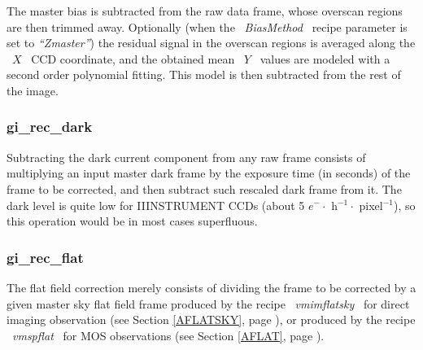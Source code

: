The master bias is subtracted from the raw data frame, whose
overscan regions are then trimmed away. Optionally (when 
the \ {\it BiasMethod} \ recipe parameter is set to {\it ``Zmaster''})
the residual signal in the overscan regions is averaged along
the \ $X$ \ CCD coordinate, and the obtained mean \ $Y$ \ values are
modeled with a second order polynomial fitting. This model is 
then subtracted from the rest of the image.

\subsubsection{gi\_rec\_dark}
\label{sec:ADARK}

Subtracting the dark current component from any raw frame consists 
of multiplying an input master dark frame by the exposure time 
(in seconds) of the frame to be corrected, and then subtract such
rescaled dark frame from it. The dark level is quite low for IIINSTRUMENT CCDs
(about 5 $e^{-} \cdot $ h$^{-1} \cdot $ pixel$^{-1}$), so this operation
would be in most cases superfluous.

\subsubsection{gi\_rec\_flat}
\label{sec:AFLATFIELDING}

The flat field correction merely consists of dividing the frame 
to be corrected by a given master sky flat field frame produced 
by the recipe \ {\it vmimflatsky} \ for direct imaging observation
(see Section \ref{AFLATSKY}, page \pageref{AFLATSKY}), or produced 
by the recipe \ {\it vmspflat} \ for MOS observations (see Section 
\ref{AFLAT}, page \pageref{AFLAT}).

\newpage

